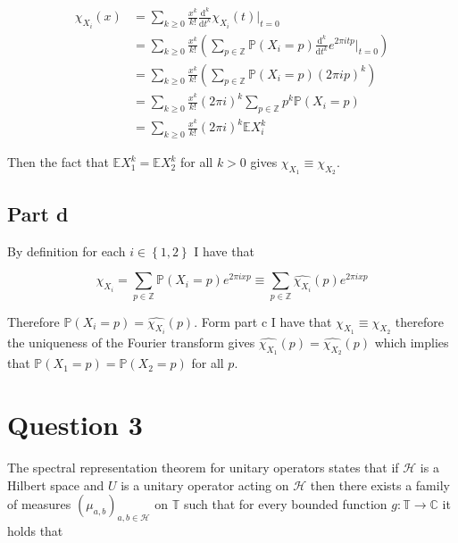 \documentclass{article}
\begin{document}
\begin{align*}
	\chi_{X_i} \left ( x \right ) & = \sum_{k \geq 0} \frac{x^k}{k!} \frac{\mathrm{d}^k}{\mathrm{d} t^k} \chi_{X_i} \left ( t \right )\Bigr|_{t=0} \\ 
	& = \sum_{k \geq 0} \frac{x^k}{k!} \left ( \sum_{p \in \mathbb{Z}} \mathbb{P} \left ( X_i = p \right ) \frac{\mathrm{d}^k}{\mathrm{d} t^k} e^{2 \pi i t p} \Bigr|_{t=0} \right ) \\ 
	& = \sum_{k \geq 0} \frac{x^k}{k!} \left ( \sum_{p \in \mathbb{Z}} \mathbb{P} \left ( X_i = p \right ) \left ( 2 \pi i p \right )^k \right ) \\ 
	& = \sum_{k \geq 0} \frac{x^k}{k!} \left (2 \pi i \right )^ k \sum_{p \in \mathbb{Z}} p^k \mathbb{P} \left ( X_i = p \right ) \\ 
	& = \sum_{k \geq 0} \frac{x^k}{k!} \left (2 \pi i \right )^ k\mathbb{E} X_i^k 
\end{align*}

Then the fact that $\mathbb{E} X_1^k = \mathbb{E} X_2^k$ for all $k > 0$ gives $\chi_{X_1} \equiv \chi_{X_2}$. 

\subsection*{Part d}

By definition for each $i \in \left \{ 1, 2 \right \}$ I have that

\begin{equation}
	\chi_{X_i} = \sum_{p \in \mathbb{Z}} \mathbb{P} \left ( X_i = p \right ) e^{2 \pi i x p} \equiv \sum_{p \in \mathbb{Z}} \widehat{\chi_{X_i}} \left ( p \right ) e^{2 \pi i x p}
\end{equation}

Therefore $\mathbb{P} \left ( X_i = p \right ) = \widehat{\chi_{X_i}} \left ( p \right )$. Form part c I have that $\chi_{X_1} \equiv \chi_{X_2}$ therefore the uniqueness of the Fourier transform gives $\widehat{\chi_{X_1}} \left ( p \right ) = \widehat{\chi_{X_2}} \left ( p \right )$ which implies that $\mathbb{P} \left ( X_1 = p \right ) = \mathbb{P} \left ( X_2 = p \right )$ for all $p$. 


\section*{Question 3}

The spectral representation theorem for unitary operators states that if $\mathcal{H}$ is a Hilbert space and $U$ is a unitary operator acting on $\mathcal{H}$ then there exists a family of measures $\left ( \mu_{a,b} \right )_{ a,b \in \mathcal{H}} $ on $\mathbb{T}$ such that for every bounded function $g : \mathbb{T} \rightarrow \mathbb{C}$ it holds that
\end{document}
